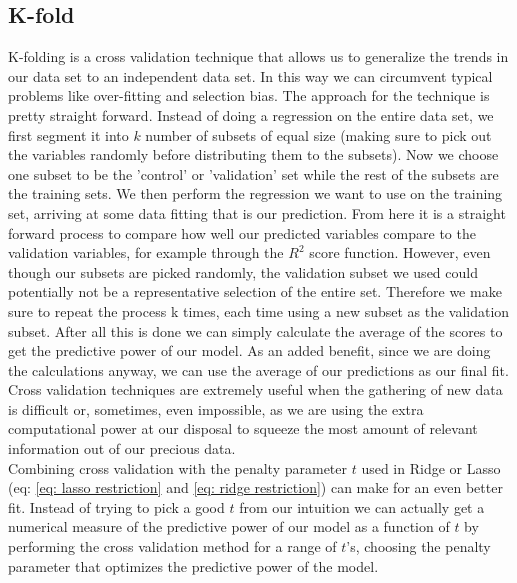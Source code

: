 \subsection{K-fold}
K-folding is a cross validation technique that allows us to generalize the trends in our data set to an independent data set. In this way we can circumvent typical problems like over-fitting and selection bias.\cite{cross-valid} The approach for the technique is pretty straight forward. Instead of doing a regression on the entire data set, we first segment it into $k$ number of subsets of equal size (making sure to pick out the variables randomly before distributing them to the subsets). Now we choose one subset to be the 'control' or 'validation' set while the rest of the subsets are the training sets. We then perform the regression we want to use on the training set, arriving at some data fitting that is our prediction. From here it is a straight forward process to compare how well our predicted variables compare to the validation variables, for example through the $R^2$ score function. However, even though our subsets are picked randomly, the validation subset we used could potentially not be a representative selection of the entire set. Therefore we make sure to repeat the process k times, each time using a new subset as the validation subset. After all this is done we can simply calculate the average of the scores to get the predictive power of our model. As an added benefit, since we are doing the calculations anyway, we can use the average of our predictions as our final fit. Cross validation techniques are extremely useful when the gathering of new data is difficult or, sometimes, even impossible, as we are using the extra computational power at our disposal to squeeze the most amount of relevant information out of our precious data.\\
Combining cross validation with the penalty parameter $t$ used in Ridge or Lasso (eq: \ref{eq: lasso restriction} and \ref{eq: ridge restriction}) can make for an even better fit.
Instead of trying to pick a good $t$ from our intuition we can actually get a numerical measure of the predictive power of our model as a function of $t$ by performing the cross validation method for a range of $t$'s, choosing the penalty parameter that optimizes the predictive power of the model.\cite{morten-reg}
